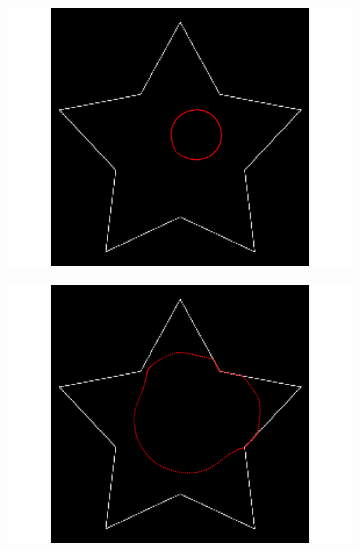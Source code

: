 \begin{appendices}
\begin{figure}[H]
\begin{subfigure}[c]{0.3\linewidth}
\centering
\includegraphics[width=\textwidth]{Chapters/Images/Init/vfccs1}
\caption{}
\end{subfigure}
\begin{subfigure}[c]{0.3\linewidth}
\centering
\includegraphics[width=\textwidth]{Chapters/Images/Init/vfccs2}
\caption{}
\end{subfigure}
\begin{subfigure}[c]{0.3\linewidth}
\centering

\end{subfigure}
\end{figure}
\end{appendices}
